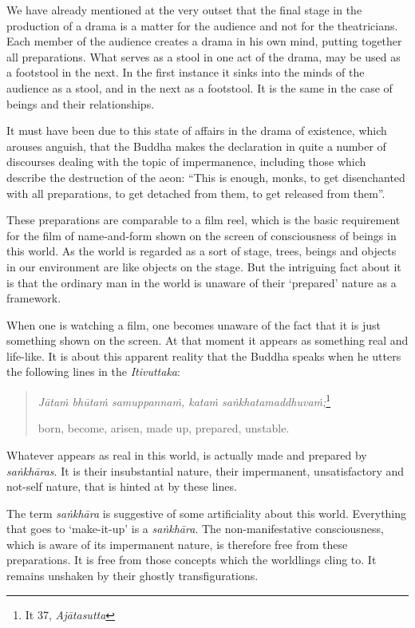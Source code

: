 We have already mentioned at the very outset that the final stage in the production of a drama is a matter for the audience and not for the theatricians. Each member of the audience creates a drama in his own mind, putting together all preparations. What serves as a stool in one act of the drama, may be used as a footstool in the next. In the first instance it sinks into the minds of the audience as a stool, and in the next as a footstool. It is the same in the case of beings and their relationships.

It must have been due to this state of affairs in the drama of existence, which arouses anguish, that the Buddha makes the declaration in quite a number of discourses dealing with the topic of impermanence, including those which describe the destruction of the aeon: ``This is enough, monks, to get disenchanted with all preparations, to get detached from them, to get released from them''.

These preparations are comparable to a film reel, which is the basic requirement for the film of name-and-form shown on the screen of consciousness of beings in this world. As the world is regarded as a sort of stage, trees, beings and objects in our environment are like objects on the stage. But the intriguing fact about it is that the ordinary man in the world is unaware of their `prepared' nature as a framework.

When one is watching a film, one becomes unaware of the fact that it is just something shown on the screen. At that moment it appears as something real and life-like. It is about this apparent reality that the Buddha speaks when he utters the following lines in the \emph{Itivuttaka}:

\begin{quote}
\emph{Jātaṁ bhūtaṁ samuppannaṁ, kataṁ saṅkhatamaddhuvaṁ;}\footnote{It 37, \emph{Ajātasutta}}

born, become, arisen, made up, prepared, unstable.
\end{quote}

Whatever appears as real in this world, is actually made and prepared by \emph{saṅkhāras}. It is their insubstantial nature, their impermanent, unsatisfactory and not-self nature, that is hinted at by these lines.

The term \emph{saṅkhāra} is suggestive of some artificiality about this world. Everything that goes to `make-it-up' is a \emph{saṅkhāra}. The non-manifestative consciousness, which is aware of its impermanent nature, is therefore free from these preparations. It is free from those concepts which the worldlings cling to. It remains unshaken by their ghostly transfigurations.

